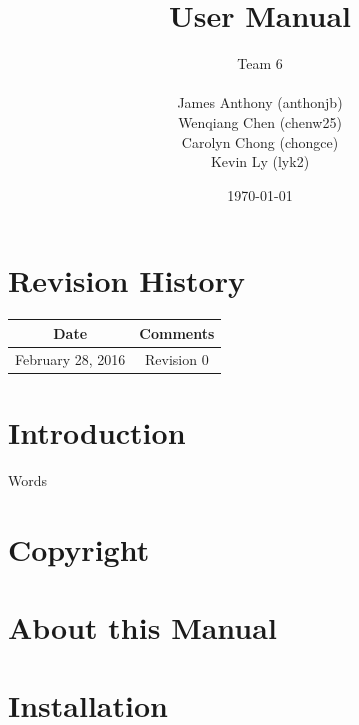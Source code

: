 \documentclass[12pt]{article}
\begin{document}
    
    \title{User Manual}
    \author{Team 6\\ \\James Anthony (anthonjb)\\ Wenqiang Chen (chenw25)\\ Carolyn Chong
        (chongce)\\ Kevin Ly (lyk2)}
    \date{\today}
    
    \maketitle
    
    \pagebreak
    
    \tableofcontents
    \listoffigures
    
    \section*{Revision History}
    \begin{tabular}{|c|c|}
        \hline
        \textbf{Date}  & \textbf{Comments} \\ \hline
        February 28, 2016 & Revision 0 \\ \hline
    \end{tabular}
    
    \pagebreak
    
    
    \section{Introduction}
    
    Words
    
    \section{Copyright}
    
    \section{About this Manual}
    
    \section{Installation}
    
\end{document}
